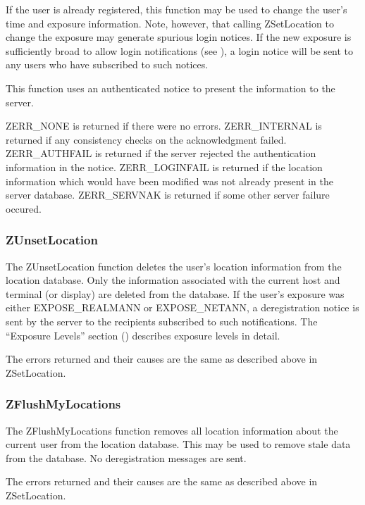 If the user is already registered, this function may be used to change
the user's time and exposure information.
Note, however, that calling ZSetLocation to change the exposure may
generate spurious login notices.  If the new exposure is sufficiently broad
to allow login notifications (see ), a login
notice will be sent to any users who have subscribed to such notices.

This function uses an authenticated notice to present the information to
the server.

ZERR_NONE is returned if there were no errors.  ZERR_INTERNAL is
returned if any consistency checks on the acknowledgment failed.
ZERR_AUTHFAIL is returned if the server rejected the authentication
information in the notice.  ZERR_LOGINFAIL is returned if the location
information which would have been modified was not already present in
the server database.  ZERR_SERVNAK is returned if some other server
failure occured.

\subsubsection{ZUnsetLocation}
\label{ZUnsetLocation}

\etemplate
{}

The ZUnsetLocation function deletes the user's location information from
the location database.  Only the information associated with the current
host and terminal (or display) are deleted from the database.  If the
user's exposure was either EXPOSE_REALMANN or EXPOSE_NETANN, a
deregistration notice is sent by the server to the
recipients subscribed to such notifications.  The ``Exposure Levels'' section
() describes exposure levels in detail.

The errors returned and their causes are the same as described above in
ZSetLocation.

\subsubsection{ZFlushMyLocations}
\label{ZFlushMyLocations}

\etemplate
{}

The ZFlushMyLocations function removes all location information about
the current user from the location database.  This may be used to
remove stale data from the database.  No deregistration messages are
sent.

The errors returned and their causes are the same as described above in
ZSetLocation.
